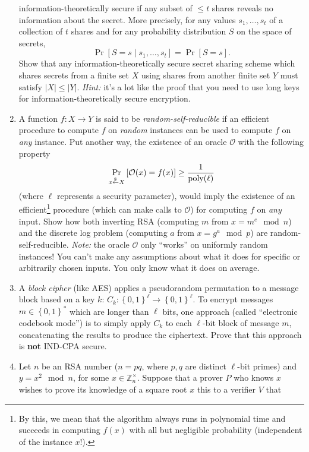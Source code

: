 \documentclass[12pt]{article}
\newcommand{\Z}{\mathbb{Z}}
\newcommand{\set}[1]{\left\{ #1 \right\}}
\newcommand{\pr}[2]{\Pr_{#1}\left[#2\right]}
\def\rand{\stackrel{{}_{\$}}{\leftarrow}} %
\newcommand{\bit}{\set{0,1}}
\newcommand{\poly}{{\mbox{\rm poly}}}
\renewcommand{\to}{\longrightarrow}
\begin{document}
\begin{enumerate}
	information-theoretically secure if any subset of \(\leq t\) shares
	reveals no information about the secret.  More precisely, for any values
	\(s_1,\dots,s_t\) of a collection of \(t\) shares and for any probability
	distribution \(S\) on the space of secrets, \[\pr{}{S=s \mid
	s_1,\dots,s_t} = \pr{}{S=s}.\]  Show that any information-theoretically
	secure secret sharing scheme which shares secrets from a finite set \(X\)
	using shares from another finite set \(Y\) must satisfy \(|X|\leq |Y|\).
	\emph{Hint:} it's a lot like the proof that you need to use long keys for
	information-theoretically secure encryption.
  \item A function \(f:X\to Y\) is said to be \emph{random-self-reducible} if
	an efficient procedure to compute \(f\) on \emph{random} instances can be
	used to compute \(f\) on \emph{any} instance.  Put another way, the
	existence of an oracle \(\mathcal{O}\) with the following property
	\[\pr{x\rand X}{\mathcal{O}(x) = f(x)} \geq \frac{1}{\poly(\ell)}\]
	(where \(\ell\) represents a security parameter), would imply the
	existence of an efficient\footnote{By this, we mean that the algorithm
	always runs in polynomial time and succeeds in computing \(f(x)\) with all
	but negligible probability (independent of the instance \(x\)!).}
	procedure (which can make calls to \(\mathcal{O}\)) for
	computing  \(f\) on \emph{any} input.  Show how both inverting RSA
	(computing \(m\) from \(x = m^e\mod n\)) and the discrete log problem
	(computing \(a\) from \(x = g^a\mod p\)) are random-self-reducible.
	\emph{Note:} the oracle \(\mathcal{O}\) only ``works'' on uniformly random
	instances!  You can't make any assumptions about what it does for specific
	or arbitrarily chosen inputs.  You only know what it does on average.
  \item A \emph{block cipher} (like AES) applies a pseudorandom permutation to
	a message block based on a key \(k\): \(C_k:\bit^\ell\to\bit^\ell\).  To
	encrypt messages \(m\in \bit^*\) which are longer than \(\ell\) bits, one
	approach (called ``electronic codebook mode'') is to simply apply \(C_k\)
	to each \(\ell\)-bit block of message \(m\), concatenating the results to
	produce the ciphertext.  Prove that this approach is \textbf{not} IND-CPA
	secure.
  \item Let \(n\) be an RSA number (\(n = pq\), where \(p,q\) are distinct
	\(\ell\)-bit primes) and \(y = x^2 \mod n\), for some \(x\in
	\Z_n^\times\).  Suppose that a prover \(P\) who knows \(x\) wishes to
	prove its knowledge of a square root \(x\) this to a verifier \(V\) that

\end{enumerate}
\end{document}
